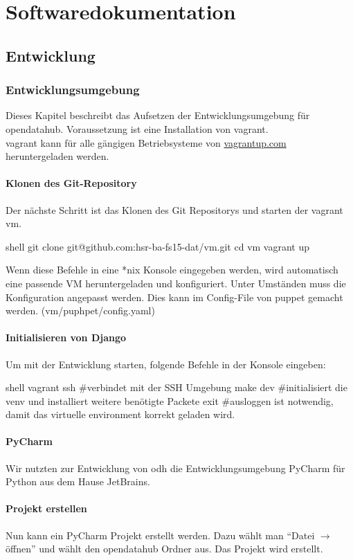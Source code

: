 \part{Softwaredokumentation}
\chapter{Entwicklung}

\section{Entwicklungsumgebung}
Dieses Kapitel beschreibt das Aufsetzen der Entwicklungsumgebung für opendatahub. Voraussetzung ist eine Installation von \acs{vagrant}.
\\
\acs{vagrant} kann für alle gängigen Betriebsysteme von \url{vagrantup.com} heruntergeladen werden.


\subsection{Klonen des Git-Repository}
Der nächste Schritt ist das Klonen des Git Repositorys und starten der vagrant vm.
\begin{src}{shell}
git clone git@github.com:hsr-ba-fs15-dat/vm.git
cd vm
vagrant up
\end{src}
Wenn diese Befehle in eine *nix Konsole eingegeben werden, wird automatisch eine passende VM heruntergeladen und konfiguriert. Unter Umständen muss die Konfiguration angepasst werden. Dies kann im Config-File von puppet gemacht werden. (vm/puphpet/config.yaml)


\subsection{Initialisieren von Django}
Um mit der Entwicklung starten, folgende Befehle in der Konsole eingeben:
\begin{src}{shell}
vagrant ssh #verbindet mit der SSH Umgebung
make dev #initialisiert die venv und installiert weitere benötigte Packete
exit #ausloggen ist notwendig, damit das virtuelle environment korrekt geladen wird.
\end{src}
\subsection{PyCharm}
Wir nutzten zur Entwicklung von \acf{odh} die Entwicklungsumgebung \acs{PyCharm} für Python aus dem Hause JetBrains.
\subsection{Projekt erstellen}
Nun kann ein PyCharm Projekt erstellt werden. Dazu wählt man ``Datei $\to$ öffnen'' und wählt den opendatahub Ordner aus. Das Projekt wird erstellt. 

